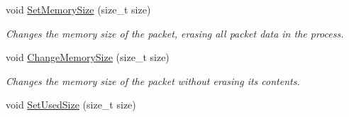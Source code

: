 \begin{DoxyCompactItemize}
void \hyperlink{class_packet_a3f7bc12f83b1a98be540be061af6a8e6}{SetMemorySize} (size\_\-t size)
\begin{DoxyCompactList}\small\item\em Changes the memory size of the packet, erasing all packet data in the process. \item\end{DoxyCompactList}\item 
void \hyperlink{class_packet_a72a324d12c83b183f77194b5d9c4ab72}{ChangeMemorySize} (size\_\-t size)
\begin{DoxyCompactList}\small\item\em Changes the memory size of the packet without erasing its contents. \item\end{DoxyCompactList}\item 
\hypertarget{class_packet_a37596c747b8db1b2c07c971259f5f786}{
void \hyperlink{class_packet_a37596c747b8db1b2c07c971259f5f786}{SetUsedSize} (size\_\-t size)}
\label{class_packet_a37596c747b8db1b2c07c971259f5f786}


\end{DoxyCompactItemize}

